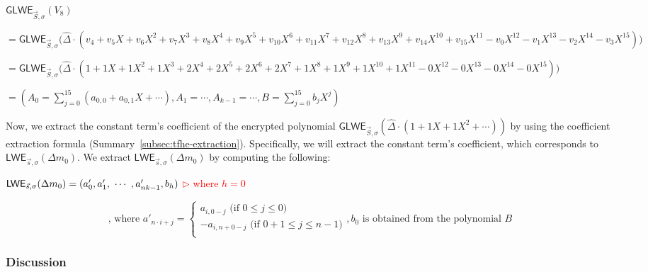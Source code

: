 \begin{enumerate}
$\textsf{GLWE}_{\vec{S}, \sigma}(V_8)$

$ = \textsf{GLWE}_{\vec{S}, \sigma}\bm(\hat{\Delta} \cdot (v_4 + v_5X + v_6X^2 + v_7X^3 + v_8X^{4} + v_9X^{5} + v_{10}X^{6} + v_{11}X^{7} + v_{12}X^{8} + v_{13}X^{9} + v_{14}X^{10} + v_{15}X^{11} - v_{0}X^{12} - v_{1}X^{13} - v_{2}X^{14} - v_{3}X^{15})\bm)$

$ = \textsf{GLWE}_{\vec{S}, \sigma}\bm(\hat{\Delta}\cdot(1 + 1X + 1X^2 + 1X^3 + 2X^{4} + 2X^{5} + 2X^{6} + 2X^{7} + 1X^{8} + 1X^{9} + 1X^{10} + 1X^{11} - 0X^{12} - 0X^{13} - 0X^{14} - 0X^{15})\bm)$

$ = \left(A_0 = \sum\limits_{j=0}^{15}(a_{0,0} + a_{0,1}X + \cdots), A_1 = \cdots, A_{k-1} = \cdots, B = \sum\limits_{j=0}^{15}b_{j}X^j\right)$

Now, we extract the constant term's coefficient of the encrypted polynomial $\textsf{GLWE}_{\vec{S}, \sigma}(\hat{\Delta} \cdot (1 + 1X + 1X^2 + \cdots))$ by using the coefficient extraction formula (Summary~\ref{subsec:tfhe-extraction}). Specifically, we will extract the constant term's coefficient, which corresponds to $\textsf{LWE}_{\vec{s}, \sigma}(\Delta m_0)$. We extract $\textsf{LWE}_{\vec{s}, \sigma}(\Delta m_0)$ by computing the following:

$\textsf{LWE}_{\vec{s}, \sigma}(\Delta m_0) = (a_0', a_1', \text{ } \text{$\cdots$} \text{ } , a_{nk-1}', b_h)$ \textcolor{red}{ $\rhd$ where $h = 0$}

\[
    \text{, where } a'_{n \cdot i + j} =   
    \begin{cases}
      a_{i,0 - j} \text{ (if } 0 \leq j \leq 0\text{)}\\
      -a_{i,n + 0 - j} \text{ (if } 0+1 \leq j \leq n-1\text{)}\\
  \end{cases}
, b_0 \text{ is obtained from the polynomial } B
\]


\end{enumerate}


\subsubsection{Discussion}
\label{subsec:tfhe-noise-bootstrapping-discussion}

